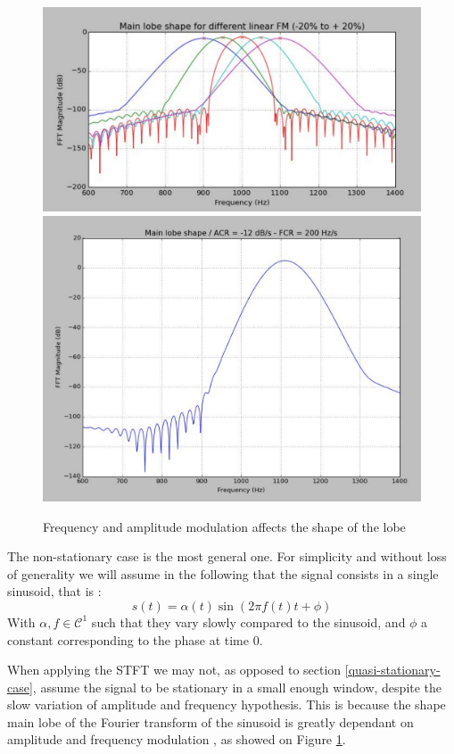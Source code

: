 \documentclass[]{article}
\begin{document}
\begin{figure}
	\centering
	\includegraphics[scale=0.25]{lobesFM.pdf}
	\includegraphics[scale=0.17]{lobesAM.pdf}
	\caption{Frequency and amplitude modulation affects the shape of the lobe}
	\label{lobesAMFM}
\end{figure}
The non-stationary case is the most general one. For simplicity and without loss of generality we will assume in the following that the signal consists in a single sinusoid, that is :
\begin{equation}
s(t) = \alpha(t)\sin(2\pi f(t) t + \phi)
\end{equation}
With $\alpha, f \in \mathcal{C}^1$ such that they vary slowly compared to the sinusoid, and $\phi$ a constant corresponding to the phase at time 0.

When applying the STFT we may not, as opposed to section \ref{quasi-stationary-case}, assume the signal to be stationary in a small enough window, despite the slow variation of amplitude and frequency hypothesis. This is because the shape main lobe of the Fourier transform of the sinusoid is greatly dependant on amplitude and frequency modulation \cite{wellsmethods,wells2006high}, as showed on Figure \ref{lobesAMFM}.
\end{document}
